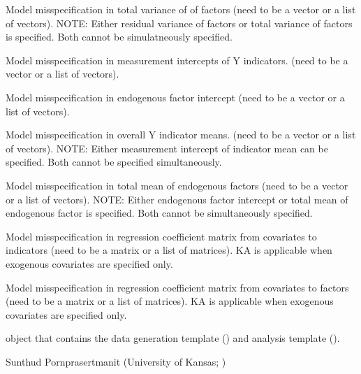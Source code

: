 \documentclass[a4paper]{book}
\begin{document}
\begin{Arguments}
\begin{ldescription}
\item[\code{VE}] 
Model misspecification in total variance of of factors (need to be a vector or a list of vectors). NOTE: Either residual variance of factors or total variance of factors is specified. Both cannot be simulatneously specified.
 
\item[\code{TY}] 
Model misspecification in measurement intercepts of Y indicators. (need to be a vector or a list of vectors).

\item[\code{AL}] 
Model misspecification in endogenous factor intercept (need to be a vector or a list of vectors).

\item[\code{MY}] 
Model misspecification in overall Y indicator means. (need to be a vector or a list of vectors). NOTE: Either measurement intercept of indicator mean can be specified. Both cannot be specified simultaneously.

\item[\code{ME}] 
Model misspecification in total mean of endogenous factors (need to be a vector or a list of vectors). NOTE: Either endogenous factor intercept or total mean of endogenous factor is specified. Both cannot be simultaneously specified.

\item[\code{KA}] 
Model misspecification in regression coefficient matrix from covariates to indicators (need to be a matrix or a list of matrices). KA is applicable when exogenous covariates are specified only.

\item[\code{GA}] 
Model misspecification in regression coefficient matrix from covariates to factors (need to be a matrix or a list of matrices). KA is applicable when exogenous covariates are specified only.

\end{ldescription}
\end{Arguments}
%
\begin{Value}
 object that contains the data generation template () and analysis template ().
\end{Value}
%
\begin{Author}\relax
Sunthud Pornprasertmanit (University of Kansas; )
\end{Author}
%
\end{document}
